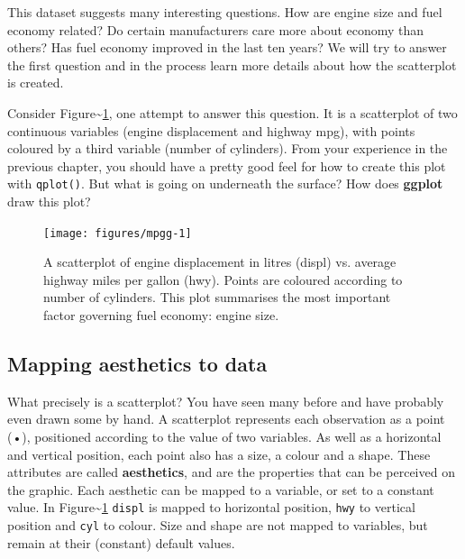 This dataset suggests many interesting questions. How are engine size
and fuel economy related? Do certain manufacturers care more about
economy than others? Has fuel economy improved in the last ten years? We
will try to answer the first question and in the process learn more
details about how the scatterplot is created.


Consider Figure\textasciitilde{}\ref{fig:mpgg}, one attempt to answer
this question. It is a scatterplot of two continuous variables (engine
displacement and highway mpg), with points coloured by a third variable
(number of cylinders). From your experience in the previous chapter, you
should have a pretty good feel for how to create this plot with
\texttt{qplot()}. But what is going on underneath the surface? How does
\textbf{ggplot} draw this plot? 

\begin{Shaded}
\begin{Highlighting}[]
  
\end{Highlighting}
\end{Shaded}

\begin{figure}
\texttt{[image: figures/mpgg-1]} \caption{A scatterplot of engine displacement in litres (displ) vs. average highway miles per gallon (hwy).  Points are coloured according to number of cylinders.  This plot summarises the most important factor governing fuel economy: engine size.\label{fig:mpgg}}
\end{figure}

\subsection{Mapping aesthetics to data}

What precisely is a scatterplot? You have seen many before and have
probably even drawn some by hand. A scatterplot represents each
observation as a point (•), positioned according to the value of two
variables. As well as a horizontal and vertical position, each point
also has a size, a colour and a shape. These attributes are called
\textbf{aesthetics}, and are the properties that can be perceived on the
graphic. Each aesthetic can be mapped to a variable, or set to a
constant value. In Figure\textasciitilde{}\ref{fig:mpgg} \texttt{displ}
is mapped to horizontal position, \texttt{hwy} to vertical position and
\texttt{cyl} to colour. Size and shape are not mapped to variables, but
remain at their (constant) default values. 

